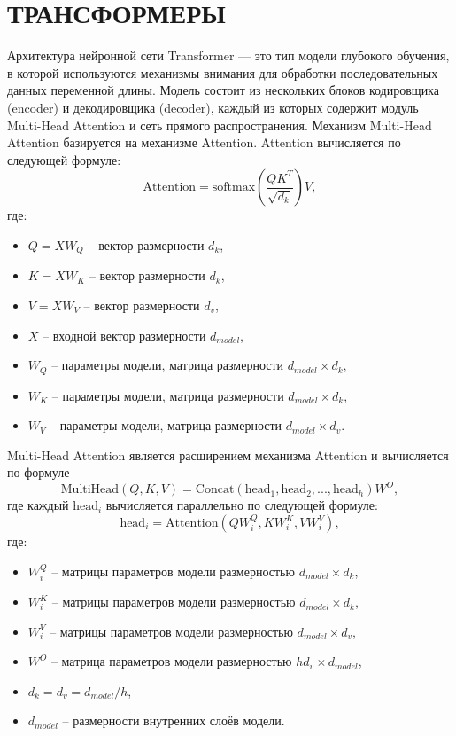 \section{ТРАНСФОРМЕРЫ}
Архитектура нейронной сети Transformer — это тип модели глубокого обучения, в которой используются механизмы внимания для 
обработки последовательных данных переменной длины. Модель состоит из нескольких блоков кодировщика (encoder) и декодировщика (decoder), 
каждый из которых содержит модуль Multi-Head Attention и сеть прямого распространения. Механизм Multi-Head Attention базируется на механизме Attention. Attention вычисляется по следующей формуле:
\begin{equation}
    \text{Attention} = \text{softmax}\left(\frac{QK^T}{\sqrt{d_k}}\right)V,
\end{equation}
где:
\begin{itemize}
    \item $Q = X W_Q$ -- вектор размерности $d_k$,
    \item $K = X W_K$ -- вектор размерности $d_k$,
    \item $V = X W_V$ -- вектор размерности $d_v$,
    \item $X$ -- входной вектор размерности $d_{model}$,
    \item $W_Q$ -- параметры модели, матрица размерности $d_{model} \times d_k$,
    \item $W_K$ -- параметры модели, матрица размерности $d_{model}\times d_k$,
    \item $W_V$ -- параметры модели, матрица размерности $d_{model} \times d_v$. 
\end{itemize}
Multi-Head Attention является расширением механизма Attention и вычисляется по формуле
\begin{equation}
    \text{MultiHead} \left(Q, K, V\right) = \text{Concat}(\text{head}_1, \text{head}_2, ..., \text{head}_h)W^O,
\end{equation}
где каждый $\text{head}_i$ вычисляется параллельно по следующей формуле:
\begin{equation}
    \text{head}_i = \text{Attention}(QW_i^Q, KW_i^K, VW_i^V),
\end{equation}
где:
\begin{itemize}
    \item $W_i^Q$ -- матрицы параметров модели размерностью $d_{model} \times d_k$,
    \item $W_i^K$ -- матрицы параметров модели размерностью $d_{model} \times d_k$,
    \item $W_i^V$ -- матрицы параметров модели размерностью $d_{model} \times d_v$,
    \item $W^O$ -- матрица параметров модели размерностью $hd_v \times d_{model}$,
    \item $d_k = d_v = d_{model} / h$,
    \item $d_{model}$ -- размерности внутренних слоёв модели.
\end{itemize}

